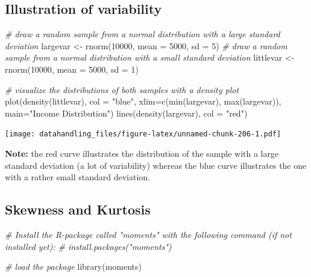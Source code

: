 \documentclass[
  12pt,
]{style/krantz}
\newenvironment{Shaded}{\begin{snugshade}}{\end{snugshade}}
\newcommand{\AttributeTok}[1]{\textcolor[rgb]{0.77,0.63,0.00}{#1}}
\newcommand{\CommentTok}[1]{\textcolor[rgb]{0.56,0.35,0.01}{\textit{#1}}}
\newcommand{\DecValTok}[1]{\textcolor[rgb]{0.00,0.00,0.81}{#1}}
\newcommand{\FunctionTok}[1]{\textcolor[rgb]{0.00,0.00,0.00}{#1}}
\newcommand{\NormalTok}[1]{#1}
\newcommand{\OtherTok}[1]{\textcolor[rgb]{0.56,0.35,0.01}{#1}}
\newcommand{\StringTok}[1]{\textcolor[rgb]{0.31,0.60,0.02}{#1}}
\begin{document}
\hypertarget{illustration-of-variability}{%
\subsection{Illustration of variability}\label{illustration-of-variability}}

\begin{Shaded}
\begin{Highlighting}[]
\CommentTok{\# draw a random sample from a normal distribution with a large standard deviation}
\NormalTok{largevar }\OtherTok{\textless{}{-}} \FunctionTok{rnorm}\NormalTok{(}\DecValTok{10000}\NormalTok{, }\AttributeTok{mean =} \DecValTok{5000}\NormalTok{, }\AttributeTok{sd =} \DecValTok{5}\NormalTok{)}
\CommentTok{\# draw a random sample from a normal distribution with a small standard deviation}
\NormalTok{littlevar }\OtherTok{\textless{}{-}} \FunctionTok{rnorm}\NormalTok{(}\DecValTok{10000}\NormalTok{, }\AttributeTok{mean =} \DecValTok{5000}\NormalTok{, }\AttributeTok{sd =} \DecValTok{1}\NormalTok{)}

\CommentTok{\# visualize the distributions of both samples with a density plot}
\FunctionTok{plot}\NormalTok{(}\FunctionTok{density}\NormalTok{(littlevar), }\AttributeTok{col =} \StringTok{"blue"}\NormalTok{, }
     \AttributeTok{xlim=}\FunctionTok{c}\NormalTok{(}\FunctionTok{min}\NormalTok{(largevar), }\FunctionTok{max}\NormalTok{(largevar)), }\AttributeTok{main=}\StringTok{"Income Distribution"}\NormalTok{)}
\FunctionTok{lines}\NormalTok{(}\FunctionTok{density}\NormalTok{(largevar), }\AttributeTok{col =} \StringTok{"red"}\NormalTok{)}
\end{Highlighting}
\end{Shaded}

\texttt{[image: datahandling\_files/figure-latex/unnamed-chunk-206-1.pdf]}

\textbf{Note:} the red curve illustrates the distribution of the sample with a large standard deviation (a lot of variability) whereas the blue curve illustrates the one with a rather small standard deviation.

\hypertarget{skewness-and-kurtosis}{%
\subsection{Skewness and Kurtosis}\label{skewness-and-kurtosis}}

\begin{Shaded}
\begin{Highlighting}[]
\CommentTok{\# Install the R{-}package called "moments" with the following command (if not installed yet):}
\CommentTok{\# install.packages("moments")}

\CommentTok{\# load the package}
\FunctionTok{library}\NormalTok{(moments)}
\end{Highlighting}
\end{Shaded}
\end{document}
